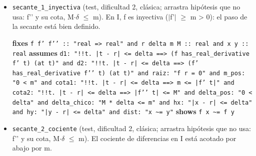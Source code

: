 \documentclass[11pt,a4paper]{article}
\begin{document}
\begin{itemize}
  \item \texttt{secante\_\allowbreak{}1\_\allowbreak{}inyectiva} (test, dificultad 2, clásica; arrastra hipótesis que no usa: f'{}' y su cota, M$\cdot \delta $ $\le $ m). En I, f es inyectiva ($|$f'$|$ $\ge $ m > 0): el paso de la secante está bien definido.\\
  {\footnotesize \textbf{fixes} \texttt{f f' f'{}' :\allowbreak{}:\allowbreak{} "real =\allowbreak{}> real" and r delta m M :\allowbreak{}:\allowbreak{} real and x y :\allowbreak{}:\allowbreak{} real} \textbf{assumes} \texttt{d1:\allowbreak{} "!{}!t. |\allowbreak{}t -\allowbreak{} r|\allowbreak{} <=\allowbreak{} delta =\allowbreak{}=\allowbreak{}> (\allowbreak{}f has\_\allowbreak{}real\_\allowbreak{}derivative f' t) (\allowbreak{}at t)" and d2:\allowbreak{} "!{}!t. |\allowbreak{}t -\allowbreak{} r|\allowbreak{} <=\allowbreak{} delta =\allowbreak{}=\allowbreak{}> (\allowbreak{}f' has\_\allowbreak{}real\_\allowbreak{}derivative f'{}' t) (\allowbreak{}at t)" and raiz:\allowbreak{} "f r =\allowbreak{} 0" and m\_\allowbreak{}pos:\allowbreak{} "0 < m" and cota1:\allowbreak{} "!{}!t. |\allowbreak{}t -\allowbreak{} r|\allowbreak{} <=\allowbreak{} delta =\allowbreak{}=\allowbreak{}> m <=\allowbreak{} |\allowbreak{}f' t|\allowbreak{}" and cota2:\allowbreak{} "!{}!t. |\allowbreak{}t -\allowbreak{} r|\allowbreak{} <=\allowbreak{} delta =\allowbreak{}=\allowbreak{}> |\allowbreak{}f'{}' t|\allowbreak{} <=\allowbreak{} M" and delta\_\allowbreak{}pos:\allowbreak{} "0 < delta" and delta\_\allowbreak{}chico:\allowbreak{} "M *\allowbreak{} delta <=\allowbreak{} m" and hx:\allowbreak{} "|\allowbreak{}x -\allowbreak{} r|\allowbreak{} <=\allowbreak{} delta" and hy:\allowbreak{} "|\allowbreak{}y -\allowbreak{} r|\allowbreak{} <=\allowbreak{} delta" and dist:\allowbreak{} "x \textasciitilde{}=\allowbreak{} y"} \textbf{shows} \texttt{f x \textasciitilde{}=\allowbreak{} f y}\par}
  \item \texttt{secante\_\allowbreak{}2\_\allowbreak{}cociente} (test, dificultad 2, clásica; arrastra hipótesis que no usa: f'{}' y su cota, M$\cdot \delta $ $\le $ m). El cociente de diferencias en I está acotado por abajo por m.\\

\end{itemize}
\end{document}
